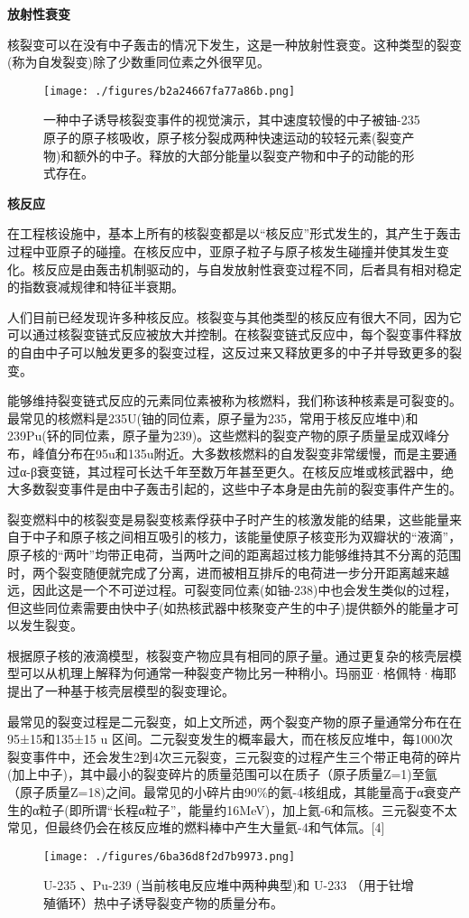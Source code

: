 \textbf{放射性衰变}

核裂变可以在没有中子轰击的情况下发生，这是一种放射性衰变。这种类型的裂变(称为自发裂变)除了少数重同位素之外很罕见。
\begin{figure}[ht]
\centering
\texttt{[image: ./figures/b2a24667fa77a86b.png]}
\caption{一种中子诱导核裂变事件的视觉演示，其中速度较慢的中子被铀-235原子的原子核吸收，原子核分裂成两种快速运动的较轻元素(裂变产物)和额外的中子。释放的大部分能量以裂变产物和中子的动能的形式存在。} \label{fig_HLB_1}
\end{figure}

\textbf{核反应}

在工程核设施中，基本上所有的核裂变都是以“核反应”形式发生的，其产生于轰击过程中亚原子的碰撞。在核反应中，亚原子粒子与原子核发生碰撞并使其发生变化。核反应是由轰击机制驱动的，与自发放射性衰变过程不同，后者具有相对稳定的指数衰减规律和特征半衰期。

人们目前已经发现许多种核反应。核裂变与其他类型的核反应有很大不同，因为它可以通过核裂变链式反应被放大并控制。在核裂变链式反应中，每个裂变事件释放的自由中子可以触发更多的裂变过程，这反过来又释放更多的中子并导致更多的裂变。

能够维持裂变链式反应的元素同位素被称为核燃料，我们称该种核素是可裂变的。最常见的核燃料是235U(铀的同位素，原子量为235，常用于核反应堆中)和239Pu(钚的同位素，原子量为239)。这些燃料的裂变产物的原子质量呈成双峰分布，峰值分布在95u和135u附近。大多数核燃料的自发裂变非常缓慢，而是主要通过α-β衰变链，其过程可长达千年至数万年甚至更久。在核反应堆或核武器中，绝大多数裂变事件是由中子轰击引起的，这些中子本身是由先前的裂变事件产生的。

裂变燃料中的核裂变是易裂变核素俘获中子时产生的核激发能的结果，这些能量来自于中子和原子核之间相互吸引的核力，该能量使原子核变形为双瓣状的“液滴”，原子核的“两叶”均带正电荷，当两叶之间的距离超过核力能够维持其不分离的范围时，两个裂变随便就完成了分离，进而被相互排斥的电荷进一步分开距离越来越远，因此这是一个不可逆过程。可裂变同位素(如铀-238)中也会发生类似的过程，但这些同位素需要由快中子(如热核武器中核聚变产生的中子)提供额外的能量才可以发生裂变。

根据原子核的液滴模型，核裂变产物应具有相同的原子量。通过更复杂的核壳层模型可以从机理上解释为何通常一种裂变产物比另一种稍小。玛丽亚·格佩特·梅耶提出了一种基于核壳层模型的裂变理论。

最常见的裂变过程是二元裂变，如上文所述，两个裂变产物的原子量通常分布在在95±15和135±15 u 区间。二元裂变发生的概率最大，而在核反应堆中，每1000次裂变事件中，还会发生2到4次三元裂变，三元裂变的过程产生三个带正电荷的碎片(加上中子)，其中最小的裂变碎片的质量范围可以在质子（原子质量Z=1)至氩（原子质量Z=18)之间。最常见的小碎片由90\%的氦-4核组成，其能量高于α衰变产生的α粒子(即所谓“长程α粒子”，能量约16MeV)，加上氦-6和氚核。三元裂变不太常见，但最终仍会在核反应堆的燃料棒中产生大量氦-4和气体氚。[4]
\begin{figure}[ht]
\centering
\texttt{[image: ./figures/6ba36d8f2d7b9973.png]}
\caption{U-235 、Pu-239 (当前核电反应堆中两种典型)和 U-233 （用于钍增殖循环）热中子诱导裂变产物的质量分布。} \label{fig_HLB_2}
\end{figure}


